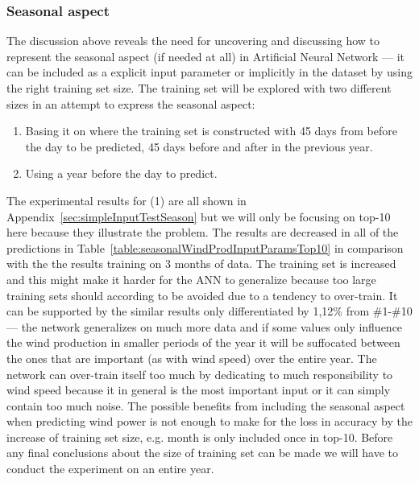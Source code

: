 \subsubsection{Seasonal aspect}
\label{sec:predictionWindProdSeasonalExperiment}
The discussion above reveals the need for uncovering and discussing how to represent the seasonal aspect (if needed at all) in Artificial Neural Network --- it can be included as a explicit input parameter or implicitly in the dataset by using the right training set size. The training set will be explored with two different sizes in an attempt to express the seasonal aspect:

\begin{enumerate}
\item Basing it on \cite{pjmForecast} where the training set is constructed with 45 days from before the day to be predicted, 45 days before and after in the previous year.
\item Using a year before the day to predict.
\end{enumerate}

The experimental results for (1) are all shown in Appendix~\ref{sec:simpleInputTestSeason} but we will only be focusing on top-10 here because they illustrate the problem. The results are decreased in all of the predictions in Table~\ref{table:seasonalWindProdInputParamsTop10} in comparison with the the results training on 3 months of data. The training set is increased and this might make it harder for the ANN to generalize because too large training sets should according to \cite{1} be avoided due to a tendency to over-train. It can be supported by the similar results only differentiated by 1,12\% from \#1-\#10 --- the network generalizes on much more data and if some values only influence the wind production in smaller periods of the year it will be suffocated between the ones that are important (as with wind speed) over the entire year. The network can over-train itself too much by dedicating to much responsibility to wind speed because it in general is the most important input or it can simply contain too much noise. The possible benefits from including the seasonal aspect when predicting wind power is not enough to make for the loss in accuracy by the increase of training set size, e.g. month is only included once in top-10. Before any final conclusions about the size of training set can be made we will have to conduct the experiment on an entire year.

